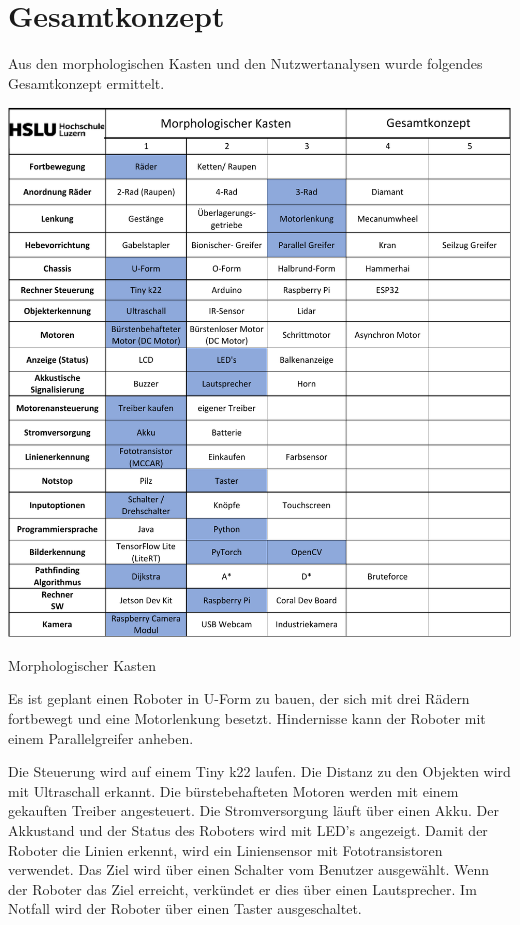 \section{Gesamtkonzept}

Aus den morphologischen Kasten und den Nutzwertanalysen wurde folgendes Gesamtkonzept ermittelt. 

\begin{table}[H]
\centering
\includegraphics[width=\textwidth -40mm]{assets/MK-all.pdf}
\caption{Morphologischer Kasten}
\label{table:mk-all}
\end{table}

Es ist geplant einen Roboter in U-Form zu bauen, der sich mit drei Rädern fortbewegt und eine Motorlenkung besetzt. Hindernisse kann der Roboter mit einem Parallelgreifer anheben.

Die Steuerung wird auf einem Tiny k22 laufen. Die Distanz zu den Objekten wird mit Ultraschall erkannt. Die bürstebehafteten Motoren werden mit einem gekauften Treiber angesteuert. Die Stromversorgung läuft über einen Akku. Der Akkustand und der Status des Roboters wird mit LED's angezeigt. Damit der Roboter die Linien erkennt, wird ein Liniensensor mit Fototransistoren verwendet. Das Ziel wird über einen Schalter vom Benutzer ausgewählt.
Wenn der Roboter das Ziel erreicht, verkündet er dies über einen Lautsprecher. Im Notfall wird der Roboter über einen Taster ausgeschaltet.

